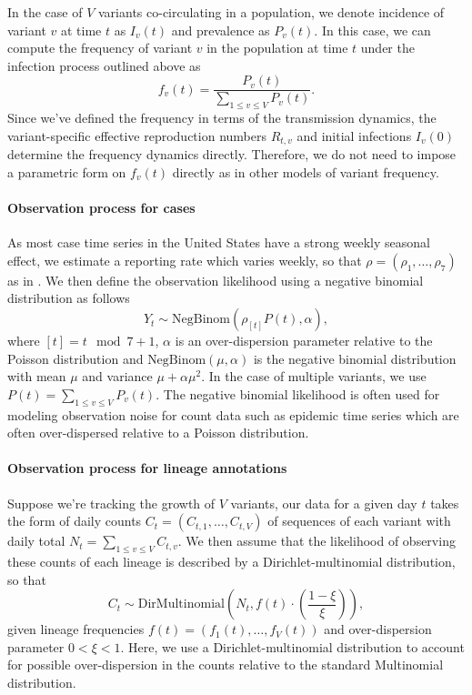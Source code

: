 \documentclass[11pt,oneside,letterpaper]{article}
\begin{document}
In the case of $V$ variants co-circulating in a population, we denote incidence of variant $v$ at time $t$ as $I_{v}(t)$ and prevalence as $P_{v}(t)$.
In this case, we can compute the frequency of variant $v$ in the population at time $t$ under the infection process outlined above as
\begin{equation}
  f_{v}(t) = \frac{P_{v}(t)}{ \sum_{1\leq v \leq V} P_{v}(t)}.
\end{equation}
Since we've defined the frequency in terms of the transmission dynamics, the variant-specific effective reproduction numbers $R_{t,v}$ and initial infections $I_{v}(0)$ determine the frequency dynamics directly.
Therefore, we do not need to impose a parametric form on $f_{v}(t)$ directly as in other models of variant frequency.

\paragraph{Observation process for cases}%

As most case time series in the United States have a strong weekly seasonal effect, we estimate a reporting rate which varies weekly, so that $\rho = (\rho_{1}, \ldots, \rho_{7})$ as in \cite{Abbott2020}.
We then define the observation likelihood using a negative binomial distribution as follows
\begin{equation}
  Y_{t} \sim \text{NegBinom}(\rho_{[t]} P(t),  \alpha),
\end{equation}
where $[t] = t \mod 7 + 1$, $\alpha$ is an over-dispersion parameter relative to the Poisson distribution and $\text{NegBinom}(\mu, \alpha)$ is the negative binomial distribution with mean $\mu$ and variance  $\mu + \alpha\mu^{2}$. In the case of multiple variants, we use $P(t) = \sum_{1\leq v \leq V} P_{v}(t)$.
The negative binomial likelihood is often used for modeling observation noise for count data such as epidemic time series which are often over-dispersed relative to a Poisson distribution.

\paragraph{Observation process for lineage annotations}%

Suppose we're tracking the growth of $V$ variants, our data for a given day $t$ takes the form of daily counts $C_{t} = (C_{t,1}, \ldots, C_{t,V})$ of sequences of each variant with daily total $N_{t} = \sum_{1\leq v \leq V} C_{t, v}$.
We then assume that the likelihood of observing these counts of each lineage is described by a Dirichlet-multinomial distribution, so that
\begin{equation}
    C_{t} \sim \text{DirMultinomial}\left(N_{t}, f(t)\cdot \left(\frac{1-\xi}{\xi}\right)\right),
\end{equation}
given lineage frequencies $f(t) = (f_{1}(t), \ldots, f_{V}(t))$ and over-dispersion parameter $0<\xi<1$.
Here, we use a Dirichlet-multinomial distribution to account for possible over-dispersion in the counts relative to the standard Multinomial distribution.
\end{document}
